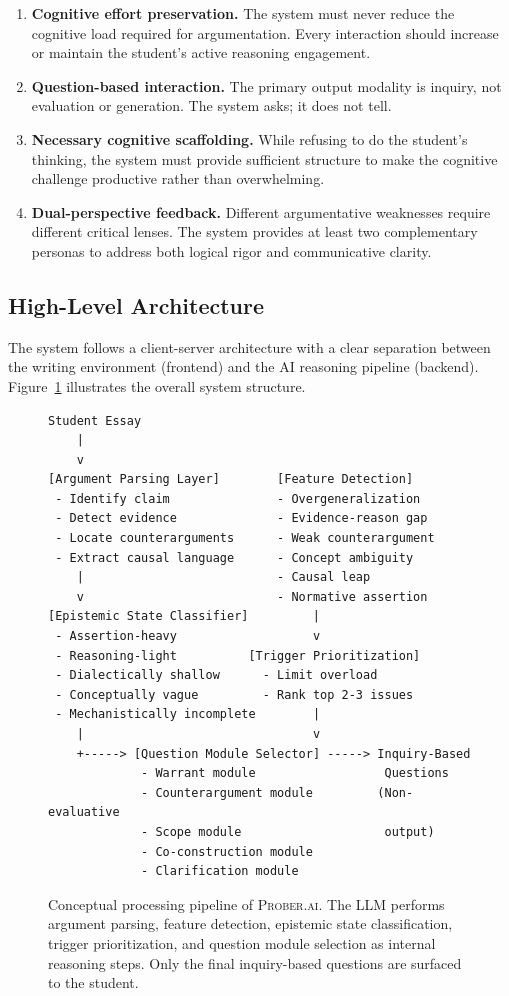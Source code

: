 \documentclass[11pt,a4paper]{article}
\begin{document}
\begin{enumerate}[leftmargin=*]
    \item \textbf{Cognitive effort preservation.} The system must never reduce the cognitive load required for argumentation. Every interaction should increase or maintain the student's active reasoning engagement.

    \item \textbf{Question-based interaction.} The primary output modality is inquiry, not evaluation or generation. The system asks; it does not tell.

    \item \textbf{Necessary cognitive scaffolding.} While refusing to do the student's thinking, the system must provide sufficient structure to make the cognitive challenge productive rather than overwhelming.

    \item \textbf{Dual-perspective feedback.} Different argumentative weaknesses require different critical lenses. The system provides at least two complementary personas to address both logical rigor and communicative clarity.
\end{enumerate}

\subsection{High-Level Architecture}

The system follows a client-server architecture with a clear separation between the writing environment (frontend) and the AI reasoning pipeline (backend). Figure~\ref{fig:architecture} illustrates the overall system structure.

\begin{figure}[ht]
\centering
\begin{BVerbatim}
Student Essay
    |
    v
[Argument Parsing Layer]        [Feature Detection]
 - Identify claim               - Overgeneralization
 - Detect evidence              - Evidence-reason gap
 - Locate counterarguments      - Weak counterargument
 - Extract causal language      - Concept ambiguity
    |                           - Causal leap
    v                           - Normative assertion
[Epistemic State Classifier]         |
 - Assertion-heavy                   v
 - Reasoning-light          [Trigger Prioritization]
 - Dialectically shallow      - Limit overload
 - Conceptually vague         - Rank top 2-3 issues
 - Mechanistically incomplete        |
    |                                v
    +-----> [Question Module Selector] -----> Inquiry-Based
             - Warrant module                  Questions
             - Counterargument module         (Non-evaluative
             - Scope module                    output)
             - Co-construction module
             - Clarification module
\end{BVerbatim}
\caption{Conceptual processing pipeline of \textsc{Prober.ai}. The LLM performs argument parsing, feature detection, epistemic state classification, trigger prioritization, and question module selection as internal reasoning steps. Only the final inquiry-based questions are surfaced to the student.}
\label{fig:architecture}
\end{figure}
\end{document}
